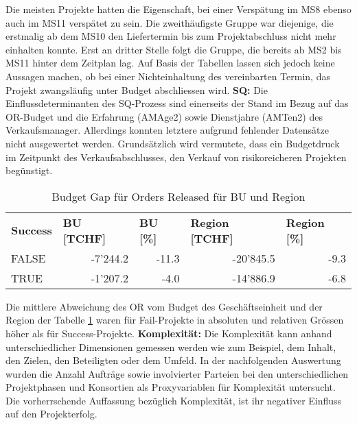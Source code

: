 Die meisten Projekte hatten die Eigenschaft, bei einer Verspätung im MS8 ebenso auch im MS11 verspätet zu sein. Die zweithäufigste Gruppe war diejenige, die erstmalig ab dem MS10 den Liefertermin bis zum Projektabschluss nicht mehr einhalten konnte. Erst an dritter Stelle folgt die Gruppe, die bereits ab MS2 bis MS11 hinter dem Zeitplan lag. Auf Basis der Tabellen lassen sich jedoch keine Aussagen machen, ob bei einer Nichteinhaltung des vereinbarten Termin, das Projekt zwangsläufig unter Budget abschliessen wird. 
\newline\newline\textbf{SQ:} Die Einflussdeterminanten des SQ-Prozess sind einerseits der Stand im Bezug auf das OR-Budget und die Erfahrung (AMAge2) sowie Dienstjahre (AMTen2) des Verkaufsmanager. Allerdings konnten letztere aufgrund fehlender Datensätze nicht ausgewertet werden. Grundsätzlich wird vermutete, dass ein Budgetdruck im Zeitpunkt des Verkaufsabschlusses, den Verkauf von risikoreicheren Projekten begünstigt. 
\begin{table}[H]
	\centering
	\caption{Budget Gap für Orders Released für BU und Region}
	\begin{tabular}{lrr|rr}
		\textbf{Success} & \multicolumn{1}{l}{\textbf{BU [TCHF]}} & \multicolumn{1}{l}{\textbf{BU [\%]}} & \multicolumn{1}{l}{\textbf{Region [TCHF]}} & \multicolumn{1}{l}{\textbf{Region [\%]}} \\
		FALSE & -7'244.2 & -11.3 & -20'845.5 & -9.3 \\
		TRUE  & -1'207.2 & -4.0  & -14'886.9 & -6.8 \\
	\end{tabular}%
	\label{msq}%
\end{table}%
Die mittlere Abweichung des OR vom Budget des Geschäftseinheit und der Region der Tabelle \ref{msq} waren für Fail-Projekte in absoluten und relativen Grössen höher als für Success-Projekte.  
\newline\newline\textbf{Komplexität:} Die Komplexität kann anhand unterschiedlicher Dimensionen gemessen werden wie zum Beispiel, dem Inhalt, den Zielen, den Beteiligten oder dem Umfeld. In der nachfolgenden Auswertung wurden die Anzahl Aufträge sowie involvierter Parteien bei den unterschiedlichen Projektphasen und Konsortien als Proxyvariablen für Komplexität untersucht. Die vorherrschende Auffassung bezüglich Komplexität, ist ihr negativer Einfluss auf den Projekterfolg.

